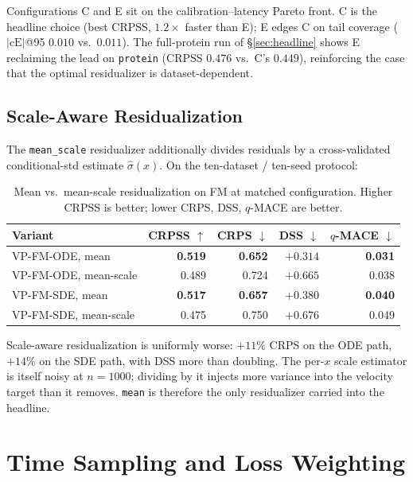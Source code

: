 \documentclass{uai2026}
\begin{document}
Configurations C and E sit on the calibration--latency Pareto front. C is the headline choice (best CRPSS, $1.2\times$ faster than E); E edges C on tail coverage ($|\text{cE}|$@95 $0.010$ vs.\ $0.011$). The full-protein run of \S\ref{sec:headline} shows E reclaiming the lead on \texttt{protein} (CRPSS $0.476$ vs.\ C's $0.449$), reinforcing the case that the optimal residualizer is dataset-dependent.

\subsection{Scale-Aware Residualization}\label{app:mean-scale}

The \texttt{mean\_scale} residualizer additionally divides residuals by a cross-validated conditional-std estimate $\hat\sigma(x)$. On the ten-dataset / ten-seed protocol:

\begin{table}[!h]
  \centering
  \caption{Mean vs.\ mean-scale residualization on FM at matched configuration. Higher CRPSS is better; lower CRPS, DSS, $q$-MACE are better.}\label{tab:mean-scale}
  \footnotesize
  \begin{tabular}{lrrrr}
    \toprule
    Variant & CRPSS $\uparrow$ & CRPS $\downarrow$ & DSS $\downarrow$ & $q$-MACE $\downarrow$ \\
    \midrule
    VP-FM-ODE, mean       & \textbf{0.519} & \textbf{0.652} & \textbf{$+0.314$} & \textbf{0.031} \\
    VP-FM-ODE, mean-scale & 0.489 & 0.724 & $+0.665$ & 0.038 \\
    VP-FM-SDE, mean       & \textbf{0.517} & \textbf{0.657} & \textbf{$+0.380$} & \textbf{0.040} \\
    VP-FM-SDE, mean-scale & 0.475 & 0.750 & $+0.676$ & 0.049 \\
    \bottomrule
  \end{tabular}
\end{table}

Scale-aware residualization is uniformly worse: $+11\%$ CRPS on the ODE path, $+14\%$ on the SDE path, with DSS more than doubling. The per-$x$ scale estimator is itself noisy at $n=1000$; dividing by it injects more variance into the velocity target than it removes. \texttt{mean} is therefore the only residualizer carried into the headline.

\section{Time Sampling and Loss Weighting}\label{app:t-and-loss}
\end{document}
